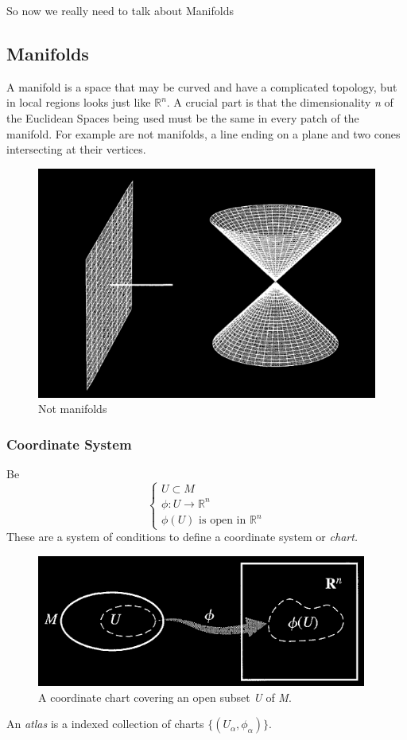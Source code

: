 So now we really need to talk about Manifolds
\subsection{Manifolds}
A manifold is a space that may be curved and have a complicated topology, but in local regions looks just like $\mathbb{R}^{n}$. A crucial part is that the dimensionality \emph{n} of the Euclidean Spaces being used must be the same in every patch of the manifold.
For example are not manifolds, a line ending on a plane and two cones intersecting at their vertices.\par
\begin{figure}[h]
\centering
\includegraphics[width=0.5\linewidth]{imm/notmanifold.png}
\caption{Not manifolds}
\label{imm:notmanifold.png}
\end{figure}

\subsubsection{Coordinate System}
Be 
\begin{equation}
\begin{cases}
U\subset M \\
\phi : U \to \mathbb{R}^{n} \\
\phi\left( U \right) \text{ is open in }\mathbb{R}^{n}
\end{cases}
\end{equation}
These are a system of conditions to define a coordinate system or \emph{chart.}\par
\begin{figure}[h]
\centering
\includegraphics[width=0.65\linewidth]{imm/chart.png}
\caption{A coordinate chart covering an open subset \emph{U} of \emph{M}.}
\label{imm:chart}
\end{figure}
An \emph{atlas} is a indexed collection of charts $\{\left( U_{\alpha}, \phi_{\alpha } \right)\}$.

